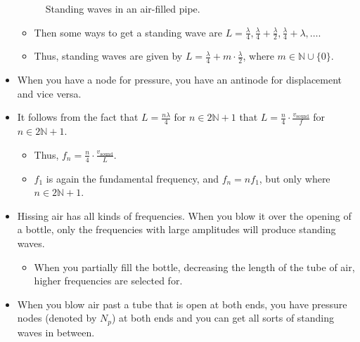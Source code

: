 \documentclass[../notes.tex]{subfiles}
\begin{document}
\begin{itemize}
\begin{figure}[h!]
        \caption{Standing waves in an air-filled pipe.}
        \label{fig:pipeStandingWaves}
    \end{figure}
    \begin{itemize}
        \item Then some ways to get a standing wave are $L=\frac{\lambda}{4},\frac{\lambda}{4}+\frac{\lambda}{2},\frac{\lambda}{4}+\lambda,\dots$.
        \item Thus, standing waves are given by $L=\frac{\lambda}{4}+m\cdot\frac{\lambda}{2}$, where $m\in\mathbb{N}\cup\{0\}$.
    \end{itemize}
    \item When you have a node for pressure, you have an antinode for displacement and vice versa.
    \item It follows from the fact that $L=\frac{n\lambda}{4}$ for $n\in 2\mathbb{N}+1$ that $L=\frac{n}{4}\cdot\frac{v_\text{sound}}{f}$ for $n\in 2\mathbb{N}+1$.
    \begin{itemize}
        \item Thus, $f_n=\frac{n}{4}\cdot\frac{v_\text{sound}}{L}$.
        \item $f_1$ is again the fundamental frequency, and $f_n=nf_1$, but only where $n\in 2\mathbb{N}+1$.
    \end{itemize}
    \item Hissing air has all kinds of frequencies. When you blow it over the opening of a bottle, only the frequencies with large amplitudes will produce standing waves.
    \begin{itemize}
        \item When you partially fill the bottle, decreasing the length of the tube of air, higher frequencies are selected for.
    \end{itemize}
    \item When you blow air past a tube that is open at both ends, you have pressure nodes (denoted by $N_p$) at both ends and you can get all sorts of standing waves in between.
    \begin{figure}[H]
        \centering
\end{figure}
\end{itemize}
\end{document}
